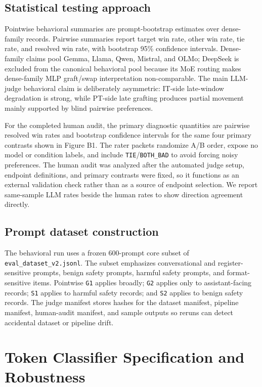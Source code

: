 \documentclass[11pt]{article}
\begin{document}
\subsection{Statistical testing approach}

Pointwise behavioral summaries are prompt-bootstrap estimates over dense-family records. Pairwise summaries report target win rate, other win rate, tie rate, and resolved win rate, with bootstrap 95\% confidence intervals. Dense-family claims pool Gemma, Llama, Qwen, Mistral, and OLMo; DeepSeek is excluded from the canonical behavioral pool because its MoE routing makes dense-family MLP graft/swap interpretation non-comparable. The main LLM-judge behavioral claim is deliberately asymmetric: IT-side late-window degradation is strong, while PT-side late grafting produces partial movement mainly supported by blind pairwise preferences.

For the completed human audit, the primary diagnostic quantities are pairwise resolved win rates and bootstrap confidence intervals for the same four primary contrasts shown in Figure B1. The rater packets randomize A/B order, expose no model or condition labels, and include \texttt{TIE}/\texttt{BOTH\_BAD} to avoid forcing noisy preferences. The human audit was analyzed after the automated judge setup, endpoint definitions, and primary contrasts were fixed, so it functions as an external validation check rather than as a source of endpoint selection. We report same-sample LLM rates beside the human rates to show direction agreement directly.

\subsection{Prompt dataset construction}

The behavioral run uses a frozen 600-prompt core subset of \texttt{eval\_dataset\_v2.jsonl}. The subset emphasizes conversational and register-sensitive prompts, benign safety prompts, harmful safety prompts, and format-sensitive items. Pointwise \texttt{G1} applies broadly; \texttt{G2} applies only to assistant-facing records; \texttt{S1} applies to harmful safety records; and \texttt{S2} applies to benign safety records. The judge manifest stores hashes for the dataset manifest, pipeline manifest, human-audit manifest, and sample outputs so reruns can detect accidental dataset or pipeline drift.

\section{Token Classifier Specification and Robustness}
\end{document}
